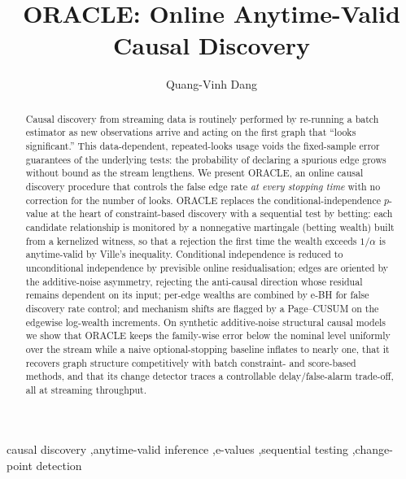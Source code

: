 \documentclass[preprint,12pt,authoryear]{elsarticle}
\begin{document}
\begin{frontmatter}

\title{ORACLE: Online Anytime-Valid Causal Discovery}

\author[inst1]{Quang-Vinh Dang}


\begin{abstract}
Causal discovery from streaming data is routinely performed by re-running a
batch estimator as new observations arrive and acting on the first graph that
``looks significant.'' This data-dependent, repeated-looks usage voids the
fixed-sample error guarantees of the underlying tests: the probability of
declaring a spurious edge grows without bound as the stream lengthens. We
present ORACLE, an online causal discovery procedure that controls the false
edge rate \emph{at every stopping time} with no correction for the number of
looks. ORACLE replaces the conditional-independence $p$-value at the heart of
constraint-based discovery with a sequential test by betting: each candidate
relationship is monitored by a nonnegative martingale (betting wealth) built
from a kernelized witness, so that a rejection the first time the wealth exceeds
$1/\alpha$ is anytime-valid by Ville's inequality. Conditional independence is
reduced to unconditional independence by previsible online residualisation;
edges are oriented by the additive-noise asymmetry, rejecting the anti-causal
direction whose residual remains dependent on its input; per-edge wealths are
combined by e-BH for false discovery rate control; and mechanism shifts are
flagged by a Page--CUSUM on the edgewise log-wealth increments. On synthetic
additive-noise structural causal models we show that ORACLE keeps the
family-wise error below the nominal level uniformly over the stream while a
naive optional-stopping baseline inflates to nearly one, that it recovers graph
structure competitively with batch constraint- and score-based methods, and
that its change detector traces a controllable delay/false-alarm trade-off, all
at streaming throughput.
\end{abstract}

\begin{keyword}
causal discovery \sep anytime-valid inference \sep e-values \sep sequential testing \sep change-point detection
\end{keyword}

\end{frontmatter}
\end{document}
